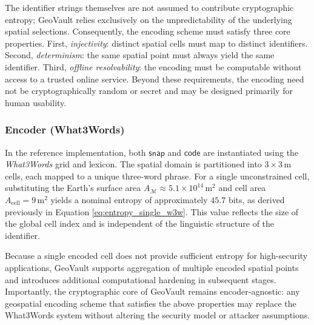 \documentclass[mathematics,article,accept,pdftex,moreauthors]{Definitions/mdpi}
\begin{document}
The identifier strings themselves are not assumed to contribute cryptographic entropy; GeoVault relies exclusively on the unpredictability of the underlying spatial selections. Consequently, the encoding scheme must satisfy three core properties. First, \emph{injectivity}: distinct spatial cells must map to distinct identifiers. Second, \emph{determinism}: the same spatial point must always yield the same identifier. Third, \emph{offline resolvability}: the encoding must be computable without access to a trusted online service. Beyond these requirements, the encoding need not be cryptographically random or secret and may be designed primarily for human usability.

\subsubsection{ Encoder (What3Words)}
In the reference implementation, both $\mathsf{snap}$ and $\mathsf{code}$ are instantiated using the \emph{What3Words} grid and lexicon. The spatial domain is partitioned into $3 \times 3\,\mathrm{m}$ cells, each mapped to a unique three-word phrase. For a single unconstrained cell, substituting the Earth’s surface area $A_{\mathcal{M}} \approx 5.1 \times 10^{14}\,\mathrm{m}^2$ and cell area $A_{\mathrm{cell}} = 9\,\mathrm{m}^2$ yields a nominal entropy of approximately $45.7$ bits, as derived previously in Equation \eqref{eq:entropy_single_w3w}. This value reflects the size of the global cell index and is independent of the linguistic structure of the identifier.

Because a single encoded cell does not provide sufficient entropy for high-security applications, GeoVault supports aggregation of multiple encoded spatial points and introduces additional computational hardening in subsequent stages. Importantly, the cryptographic core of GeoVault remains encoder-agnostic: any geospatial encoding scheme that satisfies the above properties may replace the What3Words system without altering the security model or attacker assumptions.
\end{document}
